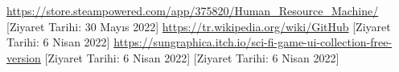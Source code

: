 \renewcommand{\refname}{KAYNAKLAR}

\begin{thebibliography}{99} %
\url{https://store.steampowered.com/app/375820/Human_Resource_Machine/} [Ziyaret Tarihi: 30 Mayıs 2022]
\url{https://tr.wikipedia.org/wiki/GitHub} [Ziyaret Tarihi: 6 Nisan 2022]
\url{https://sungraphica.itch.io/sci-fi-game-ui-collection-free-version} [Ziyaret Tarihi: 6 Nisan 2022] 
 [Ziyaret Tarihi: 6 Nisan 2022] 
\end{thebibliography}